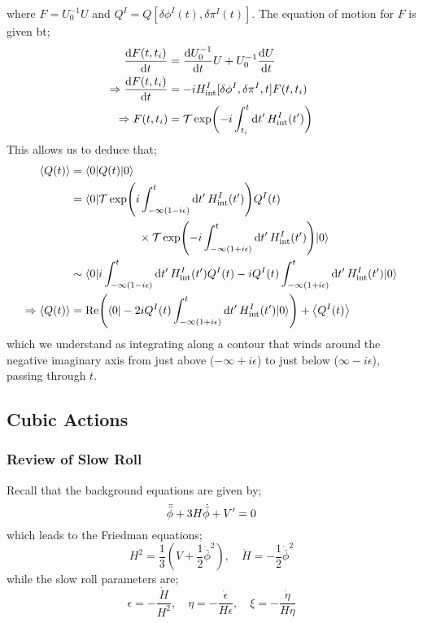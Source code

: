 where $F = U_0^{-1}U$ and $Q^I = Q[\delta \phi^{I}(t), \delta\pi^{I}(t)]$. The equation of motion for $F$ is given bt;
\begin{align*}
\frac{\ud F(t, t_i)}{\ud t} &= \frac{\ud U_{0}^{-1}}{\ud t}U + U_0^{-1}\frac{\ud U}{\ud t} \\
\Rightarrow \frac{\ud F(t, t_i)}{\ud t} &= -i H_{\text{int}}^{I}[\delta \phi^{I}, \delta \pi^{I}, t]F(t, t_i) \\
\Rightarrow F(t, t_i) &= \mT \exp\left(-i \int_{t_i}^{t}{\upd{t\pr} H_{\text{int}}^{I}(t\pr)}\right)
\end{align*}
This allows us to deduce that;
\begin{align*}
\left< Q(t) \right> &= \bra{0}Q(t)\ket{0} \\
&= \bra{0} \mT \exp\left(i \int_{-\infty(1 - i\epsilon)}^{t}{\upd{t\pr}H_{\text{int}}^{I}(t\pr)}\right) Q^{I}(t) \\
&\qquad \qquad \qquad \times\mT \exp\left(-i \int_{-\infty(1 + i\epsilon)}^{t}{\upd{t\pr}H_{\text{int}}^{I}(t\pr)}\right) \ket{0} \\
&\sim \bra{0}i \int_{-\infty(1 - i\epsilon)}^{t}{\upd{t\pr}H_{\text{int}}^{I}(t\pr)} Q^{I}(t) - i Q^{I}(t)\int_{-\infty(1 + i\epsilon)}^{t}{\upd{t\pr}H_{\text{int}}^{I}(t\pr)}\ket{0} \\
\Rightarrow \left< Q(t) \right>&= \text{Re}\left(\bra{0}-2iQ^I(t)\int_{-\infty(1 + i\epsilon)}^{t}{\upd{t\pr}H^{I}_{\text{int}}(t\pr)}\ket{0}\right) + \left< Q^I(t) \right>
\end{align*}
which we understand as integrating along a contour that winds around the negative imaginary axis from just above ($-\infty + i\epsilon$) to just below ($\infty - i \epsilon$), passing through $t$.  
\subsection{Cubic Actions}
\subsubsection{Review of Slow Roll}
Recall that the background equations are given by;
\begin{equation*}
\ddot{\bar{\phi}} + 3H \dot{\bar{\phi}} + V^{\prime} = 0
\end{equation*}
which leads to the Friedman equations;
\begin{equation*}
H^2 = \frac{1}{3}(V + \frac{1}{2}\dot{\bar{\phi}}^2), \quad \dot{H} = - \frac{1}{2}\dot{\bar{\phi}}^2
\end{equation*}
while the slow roll parameters are;
\begin{equation*}
\epsilon = - \frac{\dot{H}}{H^2}, \quad \eta = - \frac{\dot{\epsilon}}{H\epsilon}, \quad \xi = - \frac{\dot{\eta}}{H \eta}
\end{equation*}
